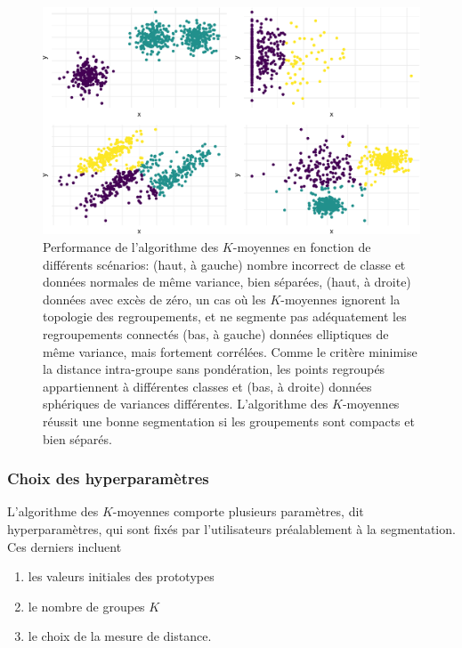 \documentclass[
  11pt,
  letterpaper,
]{scrbook}
\providecommand{\tightlist}{%
  \setlength{\itemsep}{0pt}\setlength{\parskip}{0pt}}\usepackage{longtable,booktabs,array}
\theoremstyle{definition}
\theoremstyle{remark}
\begin{document}
\begin{figure}[ht!]

{\centering \includegraphics[width=1\textwidth,height=\textheight]{./03-regroupements_files/figure-pdf/kmoyperfo-1.pdf}

}

\caption{Performance de l'algorithme des \(K\)-moyennes en fonction de
différents scénarios: (haut, à gauche) nombre incorrect de classe et
données normales de même variance, bien séparées, (haut, à droite)
données avec excès de zéro, un cas où les \(K\)-moyennes ignorent la
topologie des regroupements, et ne segmente pas adéquatement les
regroupements connectés (bas, à gauche) données elliptiques de même
variance, mais fortement corrélées. Comme le critère minimise la
distance intra-groupe sans pondération, les points regroupés
appartiennent à différentes classes et (bas, à droite) données
sphériques de variances différentes. L'algorithme des \(K\)-moyennes
réussit une bonne segmentation si les groupements sont compacts et bien
séparés.}

\end{figure}

\hypertarget{choix-des-hyperparamuxe8tres}{%
\subsubsection*{Choix des
hyperparamètres}\label{choix-des-hyperparamuxe8tres}}

L'algorithme des \(K\)-moyennes comporte plusieurs paramètres, dit
hyperparamètres, qui sont fixés par l'utilisateurs préalablement à la
segmentation. Ces derniers incluent

\begin{enumerate}
\def\labelenumi{\arabic{enumi}.}
\tightlist
\item
  les valeurs initiales des prototypes
\item
  le nombre de groupes \(K\)
\item
  le choix de la mesure de distance.
\end{enumerate}
\end{document}
